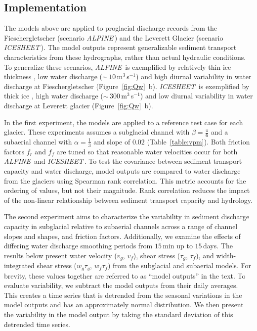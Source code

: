 \documentclass[tc, manuscript]{copernicus}
\newcommand{\alpine}{\textit{ALPINE}\,}
\newcommand{\icesheet}{\textit{ICESHEET}\,}
\begin{document}
\FloatBarrier
\subsection{Implementation}
\label{sect:imp}

The models above are applied to proglacial discharge records from the Fieschergletscher (scenario \alpine{}) and the Leverett Glacier (scenario \icesheet{}).
The model outputs represent generalizable sediment transport characteristics from these hydrographs, rather than actual hydraulic conditions.
To generalize these scenarios, \alpine{}  is exemplified by relatively thin ice thickness \citep[$h_{ice}$= $225$\,\unit{m}][]{grab2021}, low water discharge ($\sim\,10$\,\unit{m}$^3$\,\unit{s}$^{-1}$) and high diurnal variability in water discharge at Fieschergletscher (Figure~\ref{fig:Qw}\, b).
\icesheet{}  is exemplified by thick ice  \citep[$h_{ice}$= $700$\,\unit{m}; ][]{morlighem2017}, high water discharge ($\sim\,300$\,\unit{m}$^3$\,\unit{s}$^{-1}$)  and low diurnal variability in water discharge at Leverett glacier (Figure~\ref{fig:Qw}\, b).

In the first experiment, the models are applied to a reference test case for each glacier.
These experiments assumes  a subglacial channel with $\beta=\frac{\pi}{6}$ and a subaerial channel with $\alpha = \frac{1}{3}$ and slope of $0.02$ (Table~\ref{table:vpm}).
Both friction factors $f_r$ and $f_f$ are tuned so that reasonable water velocities \citep[$\sim\,1- 1.5\,$\unit{m}\,\unit{s}$^{-1}$][]{werder2010b,chandler2013} occur for both \alpine{} and \icesheet{}.
To test the covariance between sediment transport capacity and water discharge, model outputs are compared to water discharge from the glaciers using Spearman rank correlation.
This metric accounts for the ordering of values, but not their magnitude.
Rank correlation reduces the impact of the non-linear relationship between sediment transport capacity and hydrology.


The second experiment aims to characterize the variability in sediment discharge capacity in subglacial relative to subaerial channels across a range of channel slopes and shapes, and friction factors.
Additionally, we examine the effects of differing water discharge smoothing periods from $15$\,\unit{min} up to $15$\,\unit{days}.
The results below present water velocity ($v_g$, $v_f$), shear stress ($\tau_g$, $\tau_f$), and width-integrated shear stress ($w_g\tau_g$, $w_f\tau_f$) from the subglacial and subaerial models.
For brevity, these values together are referred to as ``model outputs'' in the text.
To evaluate variability, we subtract the model outputs from their daily averages. 
This creates a time series that is detrended from the seasonal variations in the model outputs and has an approximately normal distribution.
We then present the variability in the model output by taking the standard deviation of this detrended time series.
\end{document}
